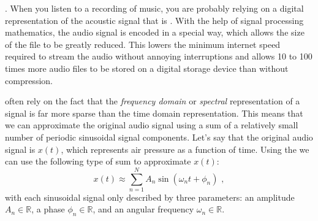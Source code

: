 . When you
listen to a recording of music, you are probably relying on a digital
representation of the acoustic signal that
is \emph{}. With the help of signal
processing mathematics, the audio signal is encoded in a special way,
which allows the size of the file to be greatly reduced. This lowers
the minimum internet speed required to stream the audio without
annoying interruptions and allows 10 to 100 times more audio files to
be stored on a digital storage device than without compression.

often rely on the fact that the \emph{frequency domain}
or \emph{spectral} representation of a signal is far more sparse than
the time domain representation. This means that we can approximate the
original audio signal using a sum of a relatively small number of
periodic sinusoidal signal components. Let's say that the original
audio signal is $x(t)$, which represents air pressure as a function of
time. Using the  we can use the
following type of sum to approximate $x(t)$:
\begin{equation}
	x(t) \approx \sum_{n=1}^{N} A_n \sin(\omega_n t + \phi_n) \,\,,
	\label{ch01:eq:fourier_ser}
\end{equation}
with each sinusoidal signal only described by three parameters: an
amplitude $A_n \in \mathbb{R}$, a phase $\phi_n \in \mathbb{R}$, and an angular frequency $\omega_n \in \mathbb{R}$.


